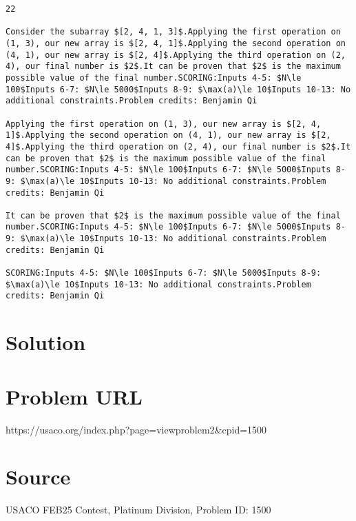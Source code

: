 \documentclass[12pt]{article}
\begin{document}
\begin{verbatim}
22

Consider the subarray $[2, 4, 1, 3]$.Applying the first operation on (1, 3), our new array is $[2, 4, 1]$.Applying the second operation on (4, 1), our new array is $[2, 4]$.Applying the third operation on (2, 4), our final number is $2$.It can be proven that $2$ is the maximum possible value of the final number.SCORING:Inputs 4-5: $N\le 100$Inputs 6-7: $N\le 5000$Inputs 8-9: $\max(a)\le 10$Inputs 10-13: No additional constraints.Problem credits: Benjamin Qi

Applying the first operation on (1, 3), our new array is $[2, 4, 1]$.Applying the second operation on (4, 1), our new array is $[2, 4]$.Applying the third operation on (2, 4), our final number is $2$.It can be proven that $2$ is the maximum possible value of the final number.SCORING:Inputs 4-5: $N\le 100$Inputs 6-7: $N\le 5000$Inputs 8-9: $\max(a)\le 10$Inputs 10-13: No additional constraints.Problem credits: Benjamin Qi

It can be proven that $2$ is the maximum possible value of the final number.SCORING:Inputs 4-5: $N\le 100$Inputs 6-7: $N\le 5000$Inputs 8-9: $\max(a)\le 10$Inputs 10-13: No additional constraints.Problem credits: Benjamin Qi

SCORING:Inputs 4-5: $N\le 100$Inputs 6-7: $N\le 5000$Inputs 8-9: $\max(a)\le 10$Inputs 10-13: No additional constraints.Problem credits: Benjamin Qi
\end{verbatim}

\section*{Solution}


\section*{Problem URL}
https://usaco.org/index.php?page=viewproblem2&cpid=1500

\section*{Source}
USACO FEB25 Contest, Platinum Division, Problem ID: 1500
\end{document}
